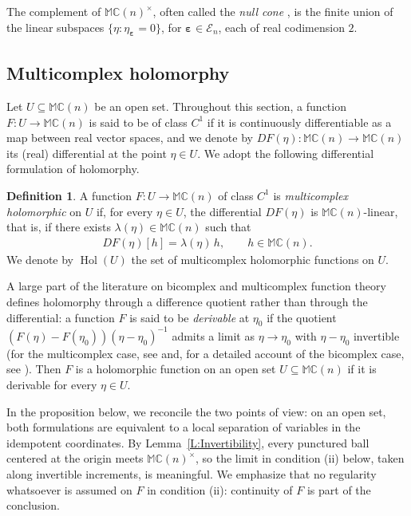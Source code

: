 \documentclass[12pt]{amsart}
\theoremstyle{plain}
\theoremstyle{definition}
\newtheorem{definition}[theorem]{Definition}
\numberwithin{equation}{section}
\newcommand{\bep}[1]{\bm{\varepsilon_{#1}}}
\newcommand{\mC}{\mathbb{C}}
\newcommand{\mM}{\mathbb{M}}
\newcommand{\ra}{\rightarrow}
\DeclareMathOperator{\hol}{Hol}
\begin{document}
The complement of $\mM \mC(n)^\times$, often called the \emph{null cone} \cite{CourchesneTremblay2025}, is the finite union of the linear subspaces $\{ \eta : \eta_{\bep{}} = 0 \}$, for $\bep{} \in \mathcal{E}_n$, each of real codimension $2$. 

\subsection{Multicomplex holomorphy}\label{SS:MCHolo}
Let $U \subseteq \mM \mC(n)$ be an open set. Throughout this section, a function $F : U \ra \mM \mC(n)$ is said to be of class $C^1$ if it is continuously differentiable as a map between real vector spaces, and we denote by $D F (\eta ) : \mM \mC(n) \ra \mM \mC(n)$ its (real) differential at the point $\eta \in U$. %
We adopt the following differential formulation of holomorphy.

    \begin{definition}\label{D:MCHolo}
    A function $F : U \ra \mM \mC(n)$ of class $C^1$ is \emph{multicomplex holomorphic} on $U$ if, for every $\eta \in U$, the differential $D F (\eta)$ is $\mM \mC(n)$-linear, that is, if there exists $\lambda (\eta ) \in \mM \mC(n)$ such that
        \begin{align*}
        DF (\eta ) [h] = \lambda (\eta )\, h , \qquad h \in \mM \mC(n).
        \end{align*}
    We denote by $\hol(U)$ the set of multicomplex holomorphic functions on $U$.
    \end{definition}

A large part of the literature on bicomplex and multicomplex function theory
defines holomorphy through a difference quotient rather than through the
differential: a function $F$ is said to be \emph{derivable} at $\eta_0$ if the
quotient $( F (\eta ) - F (\eta_0 ) ) ( \eta - \eta_0 )^{-1}$ admits a limit as
$\eta \ra \eta_0$ with $\eta - \eta_0$ invertible (for the multicomplex case, see \cite{Baley} and, for a detailed account of the bicomplex case, see \cite{Bicomplex}). Then $F$ is a holomorphic function on an open set $U \subseteq \mM \mC (n)$ if it is derivable for every $\eta \in U$. 

In the proposition below, we reconcile the two
points of view: on an open set, 
both formulations are
equivalent to a local separation of variables in the idempotent coordinates. By Lemma~\ref{L:Invertibility}, every punctured ball centered at the origin meets $\mM \mC(n)^\times$, so the limit in condition (ii) below, taken along invertible increments, is meaningful. We emphasize that no regularity whatsoever is assumed on $F$ in condition (ii): continuity of $F$ is part of the conclusion.
\end{document}
